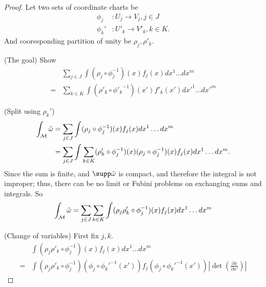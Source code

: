 \documentclass[../main.tex]{subfiles}
\begin{document}
    \begin{proof}
        Let two sets of coordinate charts be 
        \[
        \begin{aligned}
            \phi_j &: U_j \to V_j, j \in J \\
            \phi_k'&: U'_k \to V'_k, k \in K.
        \end{aligned}
        \]
        And cooresponding partition of unity be \(\rho_j, \rho'_k\).\par
        (The goal) Show
        \[
        \begin{aligned}
            &\sum_{j \in J}^{} \int
            (\rho_j \circ \phi_j ^{-1})(x) f_j(x) dx^1\dots dx^m \\
            =&\sum_{k \in K}^{} \int
            (\rho'_k \circ {\phi'_k} ^{-1})(x') f'_k(x') {dx'}^1\dots {dx'}^m
        \end{aligned}
        \]
        \par
        (Split using \(\rho_k'\))
        \[
        \begin{aligned}
            \int_{\manifold[M]} \pseudo{\omega} &= 
            \sum_{j \in J}^{} \int
            (\rho_j \circ \phi_j ^{-1})(x) f_j(x) dx^1\dots dx^m \\
            &= \sum_{j \in J}^{} \int \sum_{k \in K}^{}
            (\rho'_k\circ \phi_j ^{-1})(x)(\rho_j\circ \phi_j ^{-1})(x) f_j(x)
            dx^1\dots dx^m.
        \end{aligned}
        \]
        Since the sum is finite, and \(\supp\pseudo{\omega}\) is compact, and therefore 
        the integral is not improper; thus, there can be no limit or Fubini 
        problems on exchanging sums and integrals. So 
        \[
        \begin{aligned}
            \int_{\manifold[M]} \pseudo{\omega}
            &= \sum_{j \in J}^{}\sum_{k \in K}^{} \int 
            (\rho_j\rho'_k\circ \phi_j ^{-1})(x)f_j(x)
            dx^1\dots dx^m \\
        \end{aligned}
        \]
        \par
        (Change of variables)
        First fix \(j, k\).
        \[
        \begin{aligned}
            &\int (\rho_j\rho'_k\circ \phi_j ^{-1})(x)f_j(x) dx^1\dots dx^m \\
            =&\int (\rho_j\rho'_k\circ \phi_j ^{-1})(\phi_j\circ{\phi_k'}^{-1}(x'))
            f_j(\phi_j\circ{\phi_k'}^{-1}(x')) 
            \left|\det \left(\frac{\partial x}{\partial x'}\right)\right|

\end{aligned}\]
\end{proof}
\end{document}
